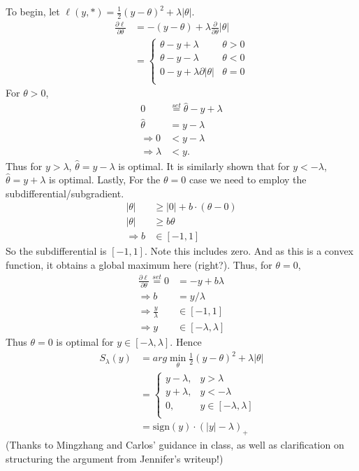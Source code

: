 \documentclass{article}
\begin{document}
\begin{enumerate}[(A)]
\color{blue}
To begin, let $\ell(y,*) = \frac{1}{2} (y-\theta)^2 + \lambda |\theta|$. 
\begin{align*}
\frac{\partial \ell}{\partial \theta} &= -(y-\theta) + \lambda \frac{\partial}{\partial \theta} |\theta| \\
&= \begin{cases} 
      \theta - y + \lambda & \theta > 0 \\
      \theta - y - \lambda & \theta < 0 \\
       0 - y  + \lambda \partial |\theta| & \theta = 0 \\
   \end{cases}
\end{align*}
For   $\theta > 0$,
\begin{align*}
0 &\stackrel{set}{=}  \hat\theta - y + \lambda\\
\hat\theta &=   y - \lambda\\
\Rightarrow 0 &< y - \lambda\\
\Rightarrow \lambda &< y.
\end{align*}
Thus for $y>\lambda$, $\hat\theta = y - \lambda$ is optimal. 
It is similarly shown that for $y < -\lambda$, $\hat\theta = y + \lambda$ is optimal. Lastly, For the $\theta = 0$ case we need to employ the subdifferential/subgradient. 
\begin{align*}
|\theta| &\ge  |0| + b \cdot (\theta - 0)\\
|\theta| &\ge b\theta \\
\Rightarrow b & \in [-1,1]
\end{align*}
So the subdifferential is $[-1,1]$. Note this includes zero. And as this is a convex function, it obtains a global maximum here (right?). 
 Thus, for $\theta=0$,  
\begin{align*}
\frac{\partial \ell}{\partial \theta} \stackrel{set}{=}0 &=  - y  + b\lambda \\
\Rightarrow b &=  y/\lambda     \\
\Rightarrow  \frac{y}{\lambda}  & \in [-1,1]   \\
\Rightarrow   y  & \in [-\lambda,\lambda]   
\end{align*}
Thus $\theta=0$ is optimal for $ y  \in [-\lambda,\lambda] $. Hence 
\begin{align*}
S_\lambda(y) 
&= arg \min_\theta \frac{1}{2}(y-\theta)^2 + \lambda| \theta| \\
&= \begin{cases} 
      y - \lambda, & y>\lambda \\
      y + \lambda ,& y<-\lambda \\
       0 , & y  \in [-\lambda,\lambda]\\
   \end{cases}\\
   & = \mbox{sign}(y) \cdot (|y| - \lambda)_+
\end{align*}
(Thanks to Mingzhang and Carlos' guidance in class, as well as clarification on structuring the argument from Jennifer's writeup!)
\color{black}


\end{enumerate}
\end{document}
